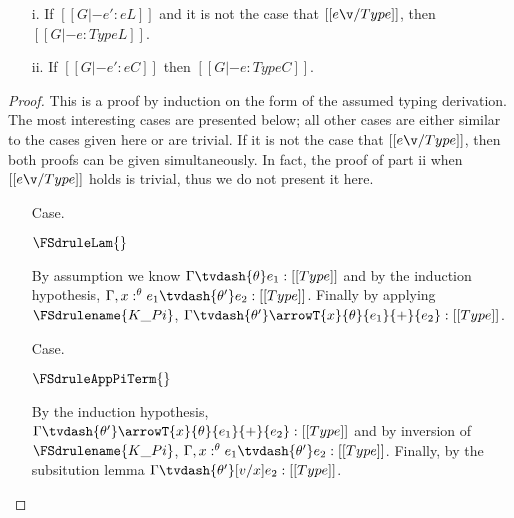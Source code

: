 \begin{lemma}[Regularity]
  \label{lemma:regularity}
  \begin{itemize}
  \item[i.] If $[[G |- e':e L]]$ and it is not the case that $[[e \v/ Type]]$, then $[[G |- e:Type L]]$.
  \item[ii.] If $[[G |- e':e C]]$ then $[[G |- e:Type C]]$.
  \end{itemize}
\end{lemma}
\begin{proof}
  This is a proof by induction on the form of the assumed typing
  derivation.  The most interesting cases are presented below; all
  other cases are either similar to the cases given here or are
  trivial.  If it is not the case that $[[e \v/ Type]]$, then both
  proofs can be given simultaneously.  In fact, the proof of part ii
  when $[[e \v/ Type]]$ holds is trivial, thus we do not present it
  here.
  
  \begin{itemize}

  \item[Case.] \ \\
    \begin{center}
      $\FSdruleLam{}$
    \end{center}
    By assumption we know $\Gamma \tvdash{\theta} e_1:[[Type]]$ and by the induction hypothesis,
    $\Gamma,x:^\theta e_1 \tvdash{\theta'} e_2:[[Type]]$. Finally by applying 
    $\FSdrulename{K\_Pi}$, $\Gamma \tvdash{\theta'} \arrowT{x}{\theta}{e_1}{+}{e_2}:[[Type]]$.


  \item[Case.] \ \\
    \begin{center}
      $\FSdruleAppPiTerm{}$
    \end{center}
    By the induction hypothesis, $\Gamma \tvdash{\theta'} \arrowT{x}{\theta}{e_1}{+}{e_2}:[[Type]]$
    and by inversion of $\FSdrulename{K\_Pi}$, $\Gamma, x:^\theta e_1 \tvdash{\theta'} e_2:[[Type]]$.
    Finally, by the subsitution lemma $\Gamma \tvdash{\theta'} [v/x]e_2:[[Type]]$.


\end{itemize}
\end{proof}

